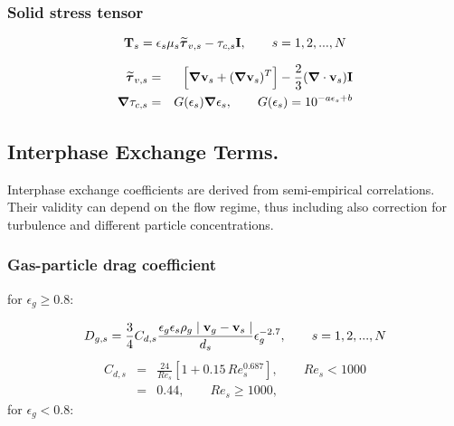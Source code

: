 \subsubsection{\hspace{1cm}Solid stress tensor}

\begin{equation}
{\bf T}_{s} = \epsilon_{s} \mu_{s} \mbox{\boldmath $\widetilde\tau$}_{v,s} - 
              \tau_{c,s} {\bf I},
\hbox{\qquad $s=1,2,...,N$}
\label{eq:solid_stress}
\end{equation}

\begin{eqnarray}
\mbox{\boldmath $\widetilde\tau$}_{v,s} & = & 
\Big[ \mbox{\boldmath $\nabla$}{\bf v}_{s}+
(\mbox{\boldmath $\nabla$}{\bf v}_{s})^{T} \Big]-
\frac{2}{3} (\mbox{\boldmath $\nabla$}\cdot {\bf v}_{s}){\bf I}
\label{eq:solid_viscous}\\
\mbox{\boldmath $\nabla$} \tau_{c,s} & = & 
G(\epsilon_s) \mbox{\boldmath $\nabla$} \epsilon_s,
\qquad G(\epsilon_s) = 10^{-a \epsilon_s + b}
\label{eq:solid_coulombic}
\end{eqnarray}

\subsection{Interphase Exchange Terms.}
Interphase exchange coefficients are derived from semi-empirical correlations.
Their validity can depend on the flow regime, thus including also 
correction for turbulence and different particle concentrations.

\subsubsection{\hspace{1cm}Gas-particle drag coefficient}

for $\epsilon_g \geq 0.8$:

\begin{equation}
D_{g,s}=\frac{3}{4}C_{d,s}\frac{\epsilon_{g}\epsilon_{s}\rho_{g}\mid 
{\bf v}_{g}- {\bf v}_{s}\mid}{d_{s}}\epsilon_{g}^{-2.7}, 
\qquad s=1,2,...,N
\label{eq:drag_less}
\end{equation}
%
\begin{eqnarray}
C_{d,s} & = & \frac{24}{Re_{s}}[1+0.15\, Re_{s}^{0.687}], 
\qquad Re_{s} < 1000 \\
& = & 0.44, \qquad Re_{s} \geq 1000,
\label{eq:drag_coeff1}
\end{eqnarray}
%
\noindent
for $\epsilon_g < 0.8$:

